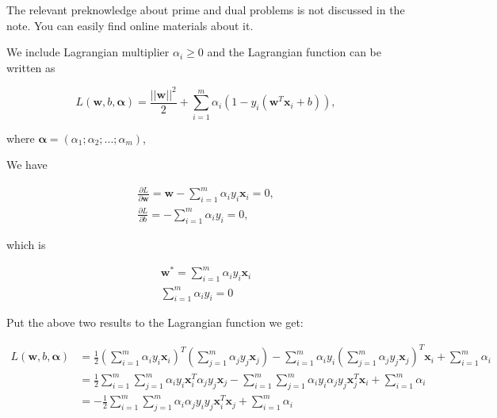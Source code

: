 \documentclass{article}
\begin{document}
The relevant preknowledge about prime and dual problems is not discussed in the note. You can easily find online materials about it.

We include Lagrangian multiplier $\alpha_i \geq 0$ and the Lagrangian function can be written as

\begin{center}
\begin{equation}
L(\boldsymbol{w}, b, \boldsymbol{\alpha}) = \frac{||\boldsymbol{w}||^2}{2} + \sum_{i=1}^{m}{\alpha_i(1-y_i(\boldsymbol{w}^T\boldsymbol{x}_i + b))}, \nonumber
\end{equation}
\end{center}

where $\boldsymbol{\alpha} = (\alpha_1; \alpha_2; ...; \alpha_m)$,

We have

\begin{gather*}
\frac{\partial L}{\partial \boldsymbol{w}} = \boldsymbol{w} - \sum_{i=1}^{m}{\alpha_i y_i \boldsymbol{x}_i} = 0, \\
\frac{\partial L}{\partial b} = - \sum_{i=1}^{m}{\alpha_i y_i} = 0,
\end{gather*}

which is

\begin{gather*}
\boldsymbol{w}^* = \sum_{i=1}^{m}{\alpha_i y_i \boldsymbol{x}_i} \\
\sum_{i=1}^{m}{\alpha_i y_i} = 0
\end{gather*}

Put the above two results to the Lagrangian function we get:

\begin{equation}
\begin{split}
L(\boldsymbol{w}, b, \boldsymbol{\alpha}) &= \frac{1}{2}(\sum_{i=1}^{m}{\alpha_i y_i \boldsymbol{x}_i})^T(\sum_{j=1}^{m}{\alpha_j y_j \boldsymbol{x}_j}) - \sum_{i=1}^{m}{\alpha_i y_i (\sum_{j=1}^{m}{\alpha_j y_j \boldsymbol{x}_j})^T \boldsymbol{x}_i} + \sum_{i=1}^{m}{\alpha_i} \\
&= \frac{1}{2}\sum_{i=1}^{m}{\sum_{j=1}^{m}{\alpha_i y_i \boldsymbol{x}_i^T \alpha_j y_j \boldsymbol{x}_j}} - \sum_{i=1}^{m}{\sum_{j=1}^{m}{\alpha_i y_i \alpha_j y_j \boldsymbol{x}_j^T \boldsymbol{x}_i}} + \sum_{i=1}^{m}{\alpha_i} \\
&= -\frac{1}{2}\sum_{i=1}^{m}{\sum_{j=1}^{m}{\alpha_i \alpha_j y_i y_j \boldsymbol{x}_i^T \boldsymbol{x}_j}} + \sum_{i=1}^{m}{\alpha_i} \nonumber
\end{split}
\end{equation}
\end{document}
